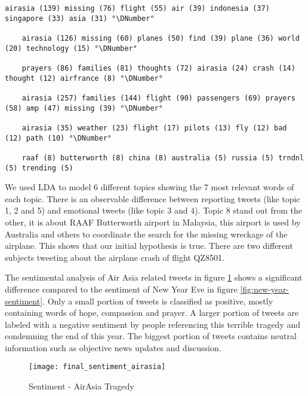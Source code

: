\begin{lstlisting}[caption={[Topic Model for Air Asia Flight Tragedy] Topic Model for Air Asia Flight Tragedy}, label={lst:topic-model-air-asia}, float=h]
	airasia (139) missing (76) flight (55) air (39) indonesia (37) singapore (33) asia (31) °\DNumber°

	airasia (126) missing (60) planes (50) find (39) plane (36) world (20) technology (15) °\DNumber°

	prayers (86) families (81) thoughts (72) airasia (24) crash (14) thought (12) airfrance (8) °\DNumber°

	airasia (257) families (144) flight (90) passengers (69) prayers (58) amp (47) missing (39) °\DNumber°

	airasia (35) weather (23) flight (17) pilots (13) fly (12) bad (12) path (10) °\DNumber°

	raaf (8) butterworth (8) china (8) australia (5) russia (5) trndnl (5) trending (5)
\end{lstlisting}

We used LDA to model 6 different topics showing the 7 most relevant words of each topic. There is an observable difference between reporting tweets (like topic 1, 2 and 5) and emotional tweets (like topic 3 and 4). Topic 8 stand out from the other, it is about RAAF Butterworth airport in Malaysia, this airport is used by Australia and others to coordinate the search for the missing wreckage of the airplane. This shows that our initial hypothesis is true. There are two different subjects tweeting about the airplane crash of flight QZ8501.

The sentimental analysis of Air Asia related tweets in figure \ref{fig:air-asia-sentiment} shows a significant difference compared to the sentiment of New Year Eve in figure \ref{fig:new-year-sentiment}. Only a small portion of tweets is classified as positive, mostly containing words of hope, compassion and prayer. A larger portion of tweets are labeled with a negative sentiment by people referencing this terrible tragedy and condemning the end of this year. The biggest portion of tweets contains neutral information such as objective news updates and discussion.

\begin{figure}[H]
  \centering
        \texttt{[image: final\_sentiment\_airasia]}
  \caption[Sentiment - AirAsia Tragedy]{Sentiment - AirAsia Tragedy}
  \label{fig:air-asia-sentiment}
  \vspace{-1.3em}
\end{figure}


